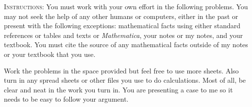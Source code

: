 \documentclass[letterpaper,12pt,addpoints]{exam}
\begin{document}
	\addpoints
	
	\textsc{Instructions:} You must work with your own effort in the following problems. You may not seek the help of any other humans or computers, either in the past or present with the following exceptions: mathematical facts using either standard references or tables and texts or \emph{Mathematica}, your notes or my notes, and your textbook. You must cite the source of any mathematical facts outside of my notes or your textbook that you use. 
	
	Work the problems in the space provided but feel free to use more sheets. Also turn in any spread sheets or other files you use to do calculations. Most of all, be clear and neat in the work you turn in. You are presenting a case to me so it needs to be easy to follow your argument. 
	
\end{document}

